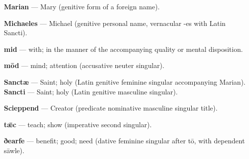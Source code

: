 \textbf{Marian} — Mary (genitive form of a foreign name).

\textbf{Michaeles} — Michael (genitive personal name, vernacular -es with Latin Sancti).

\textbf{mid} — with; in the manner of the accompanying quality or mental disposition.

\textbf{mōd} — mind; attention (accusative neuter singular).

\textbf{Sanctæ} — Saint; holy (Latin genitive feminine singular accompanying Marian). \textbf{Sancti} — Saint; holy (Latin genitive masculine singular).

\textbf{Scieppend} — Creator (predicate nominative masculine singular title).

\textbf{tǣc} — teach; show (imperative second singular).

\textbf{ðearfe} — benefit; good; need (dative feminine singular after tō, with dependent sāwle).

